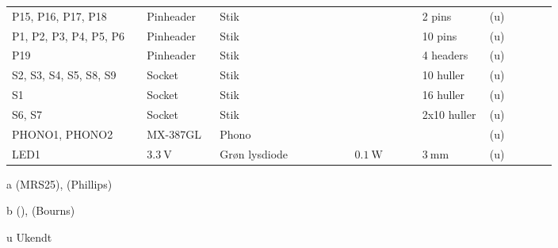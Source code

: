 \begin{table}[h!]
\begin{threeparttable}
\begin{tabular}{p{0.2\linewidth}p{0.1\linewidth}p{0.15\linewidth}p{0.05\linewidth}p{0.1\linewidth}p{0.1\linewidth}p{0.1\linewidth}}
P15, P16, P17, P18 & Pinheader & Stik &  &  & 2 pins & (u) \\
P1, P2, P3, P4, P5, P6 & Pinheader & Stik &  &  & 10 pins & (u) \\
P19 & Pinheader & Stik &  &  & 4 headers & (u) \\
S2, S3, S4, S5, S8, S9 & Socket & Stik &  &  & 10 huller & (u) \\
S1 & Socket & Stik &  &  & 16 huller & (u) \\
S6, S7 & Socket & Stik &  &  & 2x10 huller & (u) \\
PHONO1, PHONO2 & MX-387GL & Phono &  &  &  & (u) \\
LED1 & $\SI{3.3}{\volt}$ & Grøn lysdiode &  & $\SI{0.1}{\watt}$ & $\SI{3}{\milli\meter}$ & (u) \\
\hline
\bottomrule
\end{tabular}
\begin{tablenotes}
\item[a] (MRS25), (Phillips)
\item[b] (), (Bourns)
\item[u] Ukendt
\end{tablenotes}
\end{threeparttable}
\end{table} 
